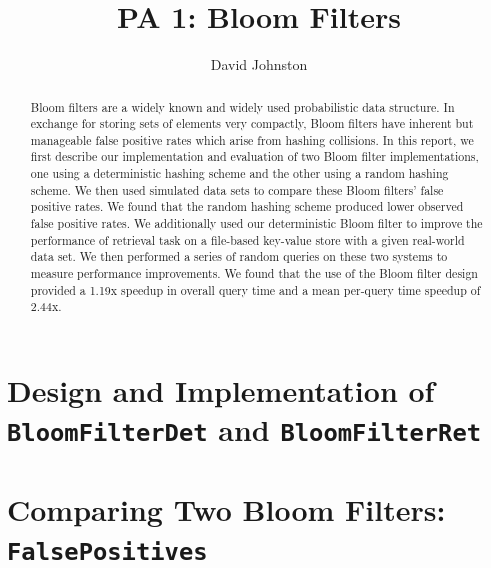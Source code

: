 \documentclass{article}
\title{PA 1: Bloom Filters}
\author{David Johnston}
\begin{document}
\maketitle

\begin{abstract}
\noindent
Bloom filters are a widely known and widely used probabilistic data structure.
In exchange for storing sets of elements very compactly, Bloom filters have
inherent but manageable false positive rates which arise from hashing
collisions. In this report, we first describe our implementation and evaluation
of two Bloom filter implementations, one using a deterministic hashing scheme
and the other using a random hashing scheme. We then used simulated data sets to
compare these Bloom filters' false positive rates. We found that the random
hashing scheme produced lower observed false positive rates. We additionally
used our deterministic Bloom filter to improve the performance of retrieval task
on a file-based key-value store with a given real-world data set. We then
performed a series of random queries on these two systems to measure performance
improvements. We found that the use of the Bloom filter design provided a 1.19x
speedup in overall query time and a mean per-query time speedup of 2.44x.
\end{abstract}

\section{Design and Implementation of \texttt{BloomFilterDet} and
         \texttt{BloomFilterRet}}

\section{Comparing Two Bloom Filters: \texttt{FalsePositives}}
\end{document}
